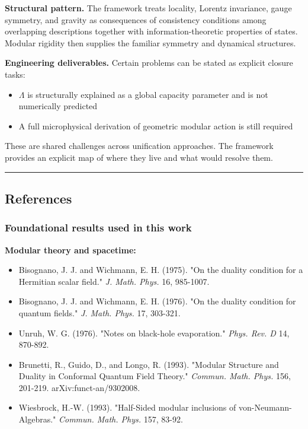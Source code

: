 \textbf{Structural pattern.} The framework treats locality, Lorentz invariance, gauge symmetry, and
gravity as consequences of consistency conditions among overlapping descriptions together with
information-theoretic properties of states. Modular rigidity then supplies the familiar symmetry
and dynamical structures.

\textbf{Engineering deliverables.} Certain problems can be stated as explicit closure tasks:

\begin{itemize}
\tightlist
\item
  \(\Lambda\) is structurally explained as a global capacity parameter and is not numerically predicted
\item
  A full microphysical derivation of geometric modular action is still required
\end{itemize}

These are shared challenges across unification approaches. The framework provides an explicit map of where they live and what would resolve them.

\begin{center}\rule{0.5\linewidth}{0.5pt}\end{center}

\ifdefined\OPHSkipEmbeddedReferences
\else
\subsection{References}\label{references-paper}

\subsubsection{Foundational results used in this work}\label{foundational-results-used-in-this-work}

\textbf{Modular theory and spacetime:}

\begin{itemize}
\tightlist
\item
  Bisognano, J. J. and Wichmann, E. H. (1975). "On the duality condition for a Hermitian scalar field." \emph{J. Math. Phys.} 16, 985-1007.
\item
  Bisognano, J. J. and Wichmann, E. H. (1976). "On the duality condition for quantum fields." \emph{J. Math. Phys.} 17, 303-321.
\item
  Unruh, W. G. (1976). "Notes on black-hole evaporation." \emph{Phys. Rev. D} 14, 870-892.
\item
  Brunetti, R., Guido, D., and Longo, R. (1993). "Modular Structure and Duality in Conformal Quantum Field Theory." \emph{Commun. Math. Phys.} 156, 201-219. arXiv:funct-an/9302008.
\item
  Wiesbrock, H.-W. (1993). "Half-Sided modular inclusions of von-Neumann-Algebras." \emph{Commun. Math. Phys.} 157, 83-92.
\end{itemize}

